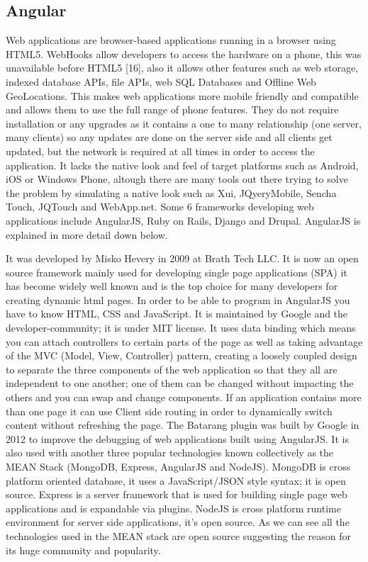 \begin{itemize}
\section{Angular}
Web applications are browser-based applications running in a browser
using HTML5. WebHooks allow developers to access the hardware on a
phone, this was unavailable before HTML5 [16], also it allows other features
such as web storage, indexed database APIs, file APIs, web SQL Databases and
Offline Web GeoLocations. This makes web applications more mobile
friendly and compatible and allows them to use the full range of phone
features. They do not require installation or any upgrades as it contains a one
to many relationship (one server, many clients) so any updates are done on
the server side and all clients get updated, but the network is required at all
times in order to access the application. It lacks the native look and feel of
target platforms such as Android, iOS or Windows Phone, altough there are
many tools out there trying to solve the problem by simulating a native look
such as Xui, JQyeryMobile, Sencha Touch, JQTouch and WebApp.net. Some
6
frameworks developing web applications include AngularJS, Ruby on Rails,
Django and Drupal. AngularJS is explained in more detail down below.

It was developed by Misko Hevery in 2009 at Brath Tech LLC. It is now an
open source framework mainly used for developing single page applications
(SPA) it has become widely well known and is the top choice for many
developers for creating dynamic html pages. In order to be able to program
in AngularJS you have to know HTML, CSS and JavaScript. It is maintained by
Google and the developer-community; it is under MIT license. It uses
data binding which means you can attach controllers to certain parts of the
page as well as taking advantage of the MVC (Model, View, Controller)
pattern, creating a loosely coupled design to separate the three components
of the web application so that they all are independent to one another; one of
them can be changed without impacting the others and you can swap and
change components. If an application contains more than one page it can use
Client side routing in order to dynamically switch content without refreshing
the page. The Batarang plugin was built by Google in 2012 to improve
the debugging of web applications built using AngularJS. It is also used with
another three popular technologies known collectively as the MEAN Stack
(MongoDB, Express, AngularJS and NodeJS). MongoDB is cross platform
oriented database, it uses a JavaScript/JSON style syntax; it is open source.
Express is a server framework that is used for building single page web
applications and is expandable via plugins. NodeJS is cross platform runtime
environment for server side applications, it’s open source. As we can see all
the technologies used in the MEAN stack are open source suggesting the
reason for its huge community and popularity.


\end{itemize}
